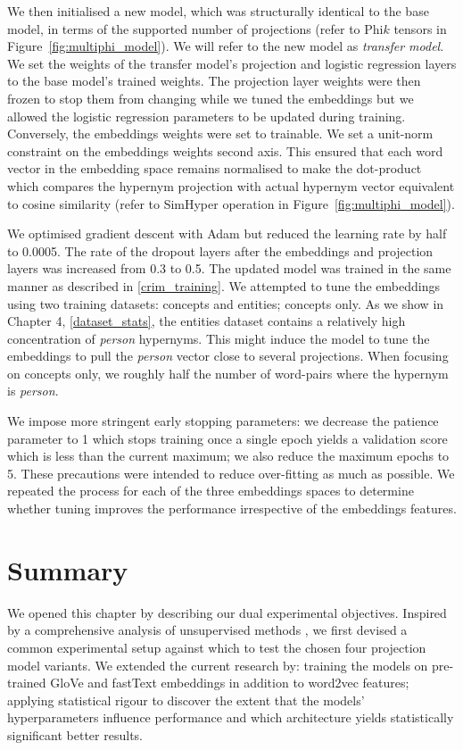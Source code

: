 We then initialised a new model, which was structurally identical to the base model, in terms of the supported number of projections (refer to Phi$k$ tensors in Figure~\ref{fig:multiphi_model}).  We will refer to the new model as \textit{transfer model}.  We set the weights of the transfer model's projection and logistic regression layers to the base model's trained weights.  The projection layer weights were then frozen to stop them from changing while we tuned the embeddings but we allowed the logistic regression parameters to be updated during training.  Conversely, the embeddings weights were set to trainable.  We set a unit-norm constraint on the embeddings weights second axis.  This ensured that each word vector in the embedding space remains normalised to make the dot-product which compares the hypernym projection with actual hypernym vector equivalent to cosine similarity (refer to SimHyper operation in Figure~\ref{fig:multiphi_model}).

We optimised gradient descent with Adam \citep{kingma2014adam} but reduced the learning rate by half to 0.0005.  The rate of the dropout layers after the embeddings and projection layers was increased from 0.3 to 0.5.  The updated model was trained in the same manner as described in \cref{crim_training}.  We attempted to tune the embeddings using two training datasets: concepts and entities; concepts only.  As we show in Chapter 4, \cref{dataset_stats}, the entities dataset contains a relatively high concentration of \textit{person} hypernyms.  This might induce the model to tune the embeddings to pull the \textit{person} vector close to several projections.  When focusing on concepts only, we roughly half the number of word-pairs where the hypernym is \textit{person}.

We impose more stringent early stopping parameters: we decrease the patience parameter to 1 which stops training once a single epoch yields a validation score which is less than the current maximum; we also reduce the maximum epochs to 5.  These precautions were intended to reduce over-fitting as much as possible.  We repeated the process for each of the three embeddings spaces to determine whether tuning improves the performance irrespective of the embeddings features.

\section{Summary}
We opened this chapter by describing our dual experimental objectives.  Inspired by a comprehensive analysis of unsupervised methods \citep{shwartz2017siege}, we first devised a common experimental setup against which to test the chosen four projection model variants. We extended the current research by: training the models on pre-trained GloVe and fastText embeddings in addition to word2vec features; applying statistical rigour to discover the extent that the models’ hyperparameters influence performance and which architecture yields statistically significant better results. 

